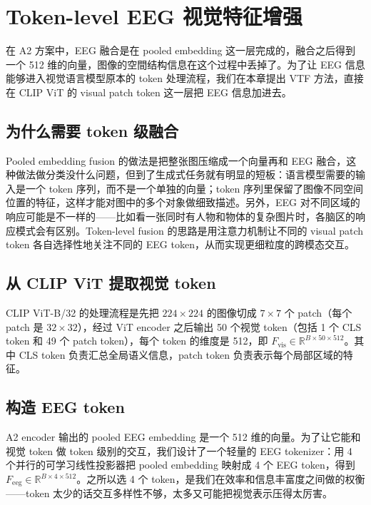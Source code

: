 \section{Token-level EEG 视觉特征增强}

在 A2 方案中，EEG 融合是在 pooled embedding 这一层完成的，融合之后得到一个 512 维的向量，图像的空間结构信息在这个过程中丢掉了。为了让 EEG 信息能够进入视觉语言模型原本的 token 处理流程，我们在本章提出 VTF 方法，直接在 CLIP ViT 的 visual patch token 这一层把 EEG 信息加进去。

\subsection{为什么需要 token 级融合}

Pooled embedding fusion 的做法是把整张图压缩成一个向量再和 EEG 融合，这种做法做分类没什么问题，但到了生成式任务就有明显的短板：语言模型需要的输入是一个 token 序列，而不是一个单独的向量；token 序列里保留了图像不同空间位置的特征，这样才能对图中的多个对象做细致描述。另外，EEG 对不同区域的响应可能是不一样的——比如看一张同时有人物和物体的复杂图片时，各脑区的响应模式会有区别。Token-level fusion 的思路是用注意力机制让不同的 visual patch token 各自选择性地关注不同的 EEG token，从而实现更细粒度的跨模态交互。

\subsection{从 CLIP ViT 提取视觉 token}

CLIP ViT-B/32 的处理流程是先把 $224\times224$ 的图像切成 $7\times7$ 个 patch（每个 patch 是 $32\times32$），经过 ViT encoder 之后输出 50 个视觉 token（包括 1 个 CLS token 和 49 个 patch token），每个 token 的维度是 512，即 $F_{\mathrm{vis}} \in \mathbb{R}^{B\times50\times512}$。其中 CLS token 负责汇总全局语义信息，patch token 负责表示每个局部区域的特征。

\subsection{构造 EEG token}

A2 encoder 输出的 pooled EEG embedding 是一个 512 维的向量。为了让它能和视觉 token 做 token 级别的交互，我们设计了一个轻量的 EEG tokenizer：用 4 个并行的可学习线性投影器把 pooled embedding 映射成 4 个 EEG token，得到 $F_{\mathrm{eeg}} \in \mathbb{R}^{B\times4\times512}$。之所以选 4 个 token，是我们在效率和信息丰富度之间做的权衡——token 太少的话交互多样性不够，太多又可能把视觉表示压得太厉害。

